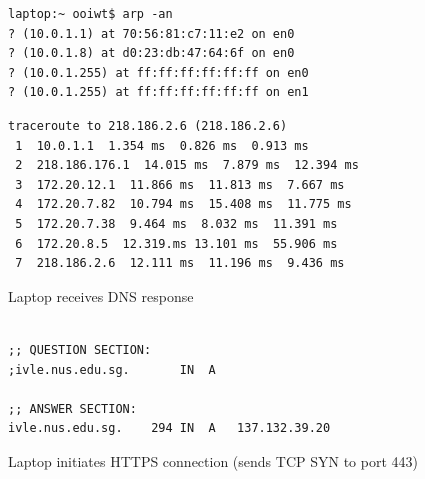 \begin{frame}[fragile]\footnotesize
\begin{verbatim}
laptop:~ ooiwt$ arp -an
? (10.0.1.1) at 70:56:81:c7:11:e2 on en0 
? (10.0.1.8) at d0:23:db:47:64:6f on en0 
? (10.0.1.255) at ff:ff:ff:ff:ff:ff on en0
? (10.0.1.255) at ff:ff:ff:ff:ff:ff on en1
\end{verbatim}

\end{frame}



\begin{frame}[fragile]\footnotesize
\begin{verbatim}
traceroute to 218.186.2.6 (218.186.2.6)
 1  10.0.1.1  1.354 ms  0.826 ms  0.913 ms
 2  218.186.176.1  14.015 ms  7.879 ms  12.394 ms
 3  172.20.12.1  11.866 ms  11.813 ms  7.667 ms
 4  172.20.7.82  10.794 ms  15.408 ms  11.775 ms
 5  172.20.7.38  9.464 ms  8.032 ms  11.391 ms
 6  172.20.8.5  12.319.ms 13.101 ms  55.906 ms
 7  218.186.2.6  12.111 ms  11.196 ms  9.436 ms
\end{verbatim}
\end{frame}

\begin{cf}{
	Laptop receives DNS response
	}
\end{cf}

\begin{frame}[fragile]\footnotesize
\begin{verbatim}

;; QUESTION SECTION:
;ivle.nus.edu.sg.		IN	A

;; ANSWER SECTION:
ivle.nus.edu.sg.	294	IN	A	137.132.39.20

\end{verbatim}
\end{frame}

\begin{cf}{
	Laptop initiates HTTPS connection
	(sends TCP SYN to port 443)
	}
\end{cf}

\begin{cf}{
}
\end{cf}

